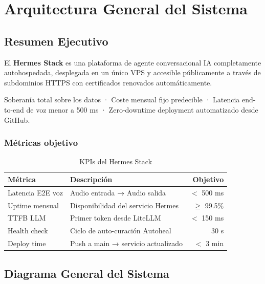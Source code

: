 \chapter{Arquitectura General del Sistema}

\section{Resumen Ejecutivo}

El \textbf{Hermes Stack} es una plataforma de agente conversacional IA
completamente autohospedada, desplegada en un único VPS y accesible
públicamente a través de subdominios HTTPS con certificados renovados
automáticamente.

\begin{infobox}
Soberanía total sobre los datos · Coste mensual fijo predecible ·
Latencia end-to-end de voz menor a 500 ms · Zero-downtime deployment
automatizado desde GitHub.
\end{infobox}

\subsection{Métricas objetivo}

\begin{table}[h]
\centering
\caption{KPIs del Hermes Stack}
\begin{tabularx}{\textwidth}{lXr}
\toprule
\textbf{Métrica} & \textbf{Descripción} & \textbf{Objetivo} \\
\midrule
Latencia E2E voz & Audio entrada → Audio salida & $<$ 500 ms \\
Uptime mensual   & Disponibilidad del servicio Hermes & $\geq$ 99.5\% \\
TTFB LLM         & Primer token desde LiteLLM & $<$ 150 ms \\
Health check     & Ciclo de auto-curación Autoheal & 30 s \\
Deploy time      & Push a main → servicio actualizado & $<$ 3 min \\
\bottomrule
\end{tabularx}
\end{table}

\section{Diagrama General del Sistema}

